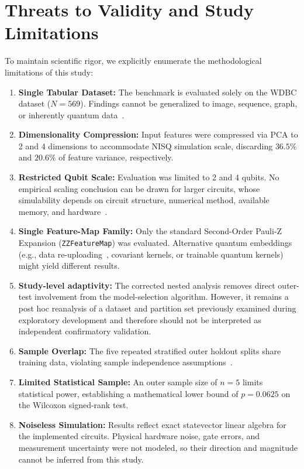 \documentclass[12pt,a4paper]{article}
\begin{document}
\section{Threats to Validity and Study Limitations}
To maintain scientific rigor, we explicitly enumerate the methodological limitations of this study:
\begin{enumerate}
    \item \textbf{Single Tabular Dataset:} The benchmark is evaluated solely on the WDBC dataset ($N=569$). Findings cannot be generalized to image, sequence, graph, or inherently quantum data~\cite{cerezo2022challenges}.
    \item \textbf{Dimensionality Compression:} Input features were compressed via PCA to 2 and 4 dimensions to accommodate NISQ simulation scale, discarding $36.5\%$ and $20.6\%$ of feature variance, respectively.
    \item \textbf{Restricted Qubit Scale:} Evaluation was limited to 2 and 4 qubits. No empirical scaling conclusion can be drawn for larger circuits, whose simulability depends on circuit structure, numerical method, available memory, and hardware~\cite{preskill2018quantum}.
    \item \textbf{Single Feature-Map Family:} Only the standard Second-Order Pauli-Z Expansion (\texttt{ZZFeatureMap}) was evaluated. Alternative quantum embeddings (e.g., data re-uploading~\cite{perezsalinas2020data}, covariant kernels, or trainable quantum kernels) might yield different results.
    \item \textbf{Study-level adaptivity:} The corrected nested analysis removes direct outer-test involvement from the model-selection algorithm. However, it remains a post hoc reanalysis of a dataset and partition set previously examined during exploratory development and therefore should not be interpreted as independent confirmatory validation.
    \item \textbf{Sample Overlap:} The five repeated stratified outer holdout splits share training data, violating sample independence assumptions~\cite{bowles2024better}.
    \item \textbf{Limited Statistical Sample:} An outer sample size of $n=5$ limits statistical power, establishing a mathematical lower bound of $p=0.0625$ on the Wilcoxon signed-rank test.
    \item \textbf{Noiseless Simulation:} Results reflect exact statevector linear algebra for the implemented circuits. Physical hardware noise, gate errors, and measurement uncertainty were not modeled, so their direction and magnitude cannot be inferred from this study.

\end{enumerate}
\end{document}
